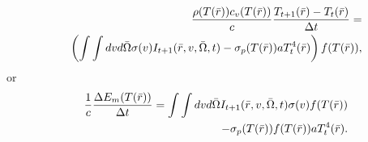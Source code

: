 	\begin{eqnarray}
	\label{Fleck10}
	&&{\rho(T(\bar{r})){c_v(T(\bar{r}))}\over{c}}{{T_{t+1}(\bar{r})-T_t(\bar{r})}\over{\Delta{t}}}=\nonumber \\&& {\left({\int\int{dv}{d\bar{\Omega}}\sigma(v)I_{t+1}(\bar{r},v,\bar{\Omega},t)-\sigma_p(T(\bar{r})){aT_t^4(\bar{r})}}\right)f(T(\bar{r}))},
	\end{eqnarray}
	or
	\begin{eqnarray}
	\label{Fleck11}
	&&{1\over{c}}{\Delta{E_m(T(\bar{r}))}\over{\Delta{t}}}={\int\int{dv}{d\bar{\Omega}}I_{t+1}(\bar{r},v,\bar{\Omega},t)\sigma(v)f(T(\bar{r}))}\nonumber \\&&
	-{\sigma_p(T(\bar{r}))f(T(\bar{r})){aT_t^4(\bar{r})}}.
	\end{eqnarray}
	

